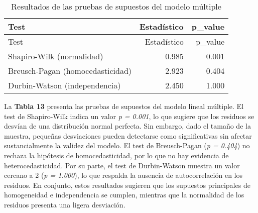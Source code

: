 \documentclass[
  spanish,
  11pt,
  a4paper,
  DIV=11,
  numbers=noendperiod]{scrartcl}
\begin{document}
\begin{longtable}[]{@{}lrr@{}}
\caption{Resultados de las pruebas de supuestos del modelo
múltiple}\tabularnewline
\toprule\noalign{}
Test & Estadístico & p\_value \\
\midrule\noalign{}
\endfirsthead
\toprule\noalign{}
Test & Estadístico & p\_value \\
\midrule\noalign{}
\endhead
\bottomrule\noalign{}
\endlastfoot
Shapiro-Wilk (normalidad) & 0.985 & 0.001 \\
Breusch-Pagan (homocedasticidad) & 2.923 & 0.404 \\
Durbin-Watson (independencia) & 2.450 & 1.000 \\
\end{longtable}

La \textbf{Tabla 13} presenta las pruebas de supuestos del modelo lineal
múltiple. El test de Shapiro-Wilk indica un valor \emph{p = 0.001}, lo
que sugiere que los residuos se desvían de una distribución normal
perfecta. Sin embargo, dado el tamaño de la muestra, pequeñas
desviaciones pueden detectarse como significativas sin afectar
sustancialmente la validez del modelo. El test de Breusch-Pagan (\emph{p
= 0.404}) no rechaza la hipótesis de homocedasticidad, por lo que no hay
evidencia de heterocedasticidad. Por su parte, el test de Durbin-Watson
muestra un valor cercano a 2 (\emph{p = 1.000}), lo que respalda la
ausencia de autocorrelación en los residuos. En conjunto, estos
resultados sugieren que los supuestos principales de homogeneidad e
independencia se cumplen, mientras que la normalidad de los residuos
presenta una ligera desviación.
\end{document}

